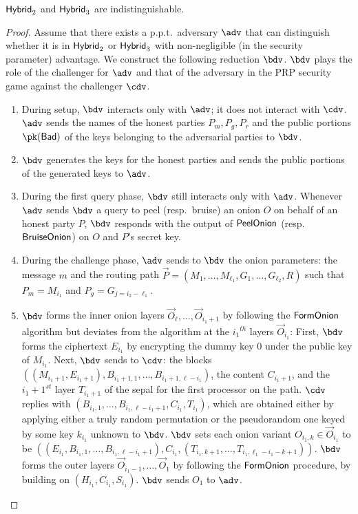 \documentclass[runningheads,a4paper]{llncs}
\begin{document}
\begin{lemma}
$\mathsf{Hybrid}_{2}$ and $\mathsf{Hybrid}_{3}$ are indistinguishable. 
\end{lemma}

\begin{proof}
Assume that there exists a p.p.t.~adversary $\adv$ that can distinguish whether it is in $\mathsf{Hybrid}_{2}$ or $\mathsf{Hybrid}_{3}$ with non-negligible (in the security parameter)  advantage. 
We construct the following reduction $\bdv$. $\bdv$ plays the role of the challenger for $\adv$ and that of the adversary in the PRP security game against the  challenger $\cdv$. 

\begin{enumerate}
\item During setup, $\bdv$ interacts only with $\adv$; it does not interact with $\cdv$. $\adv$ sends the names of the honest parties $P_m, P_g, P_r$ and the public portions $\pk(\Bad)$ of the keys  belonging to the adversarial parties to $\bdv$. 

\item $\bdv$ generates the keys for the honest parties and sends the public portions of the generated keys to $\adv$. 

\item During the first query phase, $\bdv$ still interacts only with $\adv$. Whenever $\adv$ sends $\bdv$ a query to peel (resp.~bruise) an onion $O$ on behalf of an honest party $P$, $\bdv$ responds with the output of $\mathsf{PeelOnion}$ (resp.~$\mathsf{BruiseOnion}$) on $O$ and $P$'s secret key. 

\item During the challenge phase, $\adv$ sends to $\bdv$ the onion parameters: the message $m$ and the routing path $\vec{P} = (M_1, \dots, M_{\ell_1}, G_1, \dots, G_{\ell_2}, R)$ such that $P_m = M_{i_1}$ and $P_g = G_{j=i_2-\ell_1}$. 

\item $\bdv$ forms the inner onion layers $\vec{O}_\ell, \dots, \vec{O}_{i_1+1}$ by following the $\mathsf{FormOnion}$ algorithm but deviates from the algorithm at the ${i_1}^\mathit{th}$ layers $\vec{O}_{i_1}$: 
First, $\bdv$ forms the ciphertext $E_{i_1}$ by encrypting the dummy key $0$ under the public key of $M_{i_1}$. 
Next, $\bdv$ sends to $\cdv$: the blocks  $((M_{i_1+1}, E_{i_1+1}), B_{i_1+1,1}, \dots, B_{i_1+1, \ell-i_1})$, the content $C_{i_1+1}$, and the $i_1+1^\mathit{st}$ layer $T_{i_1+1}$ of the sepal for the first processor on the path. $\cdv$ replies with $(B_{i_1, 1}, \dots, B_{i_1, \ell-i_1+1}, C_{i_1}, T_{i_1})$, which are obtained either by applying either a truly random permutation or the pseudorandom one keyed by some key $k_{i_1}$ unknown to $\bdv$. $\bdv$ sets  each onion variant $O_{i_1, k} \in \vec{O}_{i_1}$ to be $((E_{i_1}, B_{i_1, 1}, \dots, B_{i_1, \ell-i_1+1}), C_{i_1}, (T_{i_1, k+1}, \dots, T_{i_1, \ell_1-i_1-k+1}))$. $\bdv$ forms the outer layers $\vec{O}_{i_1-1}, \dots, \vec{O}_1$ by following the $\mathsf{FormOnion}$ procedure, by building on $(H_{i_1}, C_{i_1}, S_{i_1})$. $\bdv$ sends $O_1$ to $\adv$. 


\end{enumerate}
\end{proof}
\end{document}
